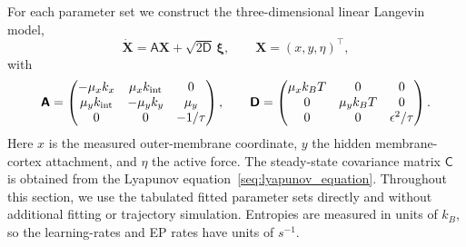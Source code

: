 \documentclass[
 longbibliography,
 twocolumn,
 superscriptaddress,
 amsmath,
 amssymb,
 amsthm,
 amsfonts,
 prl,
 floatfix,
]{revtex4-2}
\newcommand{\matbf}[1]{\boldsymbol{\mathsf{#1}}}
\begin{document}
\begin{widetext}
For each parameter set we construct the three-dimensional linear Langevin model,
\[
\dot{\bm X} = \matbf A \bm X + \sqrt{2\matbf D}\,\bm\xi, \qquad \bm X = (x,y,\eta)^\intercal,
\]
with
\[
\matbf A =
\begin{pmatrix}
-\mu_x k_x & \mu_x k_{\rm int} & 0 \\
\mu_y k_{\rm int} & -\mu_y k_y & \mu_y \\
0 & 0 & -1/\tau
\end{pmatrix},
\qquad
\matbf D =
\begin{pmatrix}
\mu_x k_B T & 0 & 0 \\
0 & \mu_y k_B T & 0 \\
0 & 0 & \epsilon^2/\tau
\end{pmatrix}.
\]
Here $x$ is the measured outer-membrane coordinate, $y$ the hidden membrane-cortex attachment, and $\eta$ the active force. The steady-state covariance matrix $\matbf C$ is obtained from the Lyapunov equation~\eqref{seq:lyapunov_equation}.
Throughout this section, we use the tabulated fitted parameter sets directly and without additional fitting or trajectory simulation. Entropies are measured in units of $k_B$, so the learning-rates and EP rates have units of $s^{-1}$.


\end{widetext}
\end{document}
